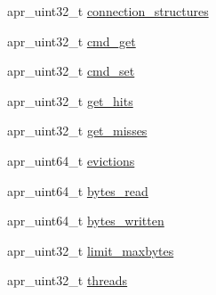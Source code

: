 \begin{DoxyCompactItemize}
apr\-\_\-uint32\-\_\-t \hyperlink{structapr__memcache__stats__t_ac155c7a510e94b3cd43aea90a05e3cd3}{connection\-\_\-structures}
\item 
apr\-\_\-uint32\-\_\-t \hyperlink{structapr__memcache__stats__t_abd9b0fa7bf554436883c8b6a2a89c2a8}{cmd\-\_\-get}
\item 
apr\-\_\-uint32\-\_\-t \hyperlink{structapr__memcache__stats__t_a4930557b41d879b1b4767862c1693f95}{cmd\-\_\-set}
\item 
apr\-\_\-uint32\-\_\-t \hyperlink{structapr__memcache__stats__t_a6d3b60bc77c024259a2e9dfb1e35bfd7}{get\-\_\-hits}
\item 
apr\-\_\-uint32\-\_\-t \hyperlink{structapr__memcache__stats__t_affaa2901db1db585fca3cfa77fcb0230}{get\-\_\-misses}
\item 
apr\-\_\-uint64\-\_\-t \hyperlink{structapr__memcache__stats__t_ad430486ea11c0e5f7b70c9c2b95a216c}{evictions}
\item 
apr\-\_\-uint64\-\_\-t \hyperlink{structapr__memcache__stats__t_acf5d7892543403de8a48e9276d94b5af}{bytes\-\_\-read}
\item 
apr\-\_\-uint64\-\_\-t \hyperlink{structapr__memcache__stats__t_a05f5b9a19c330460fe66b79746989094}{bytes\-\_\-written}
\item 
apr\-\_\-uint32\-\_\-t \hyperlink{structapr__memcache__stats__t_afbfa184ab0898d4a897a629c935783b8}{limit\-\_\-maxbytes}
\item 
apr\-\_\-uint32\-\_\-t \hyperlink{structapr__memcache__stats__t_a4e2a4875902e032a56de9ac58315f372}{threads}
\end{DoxyCompactItemize}


